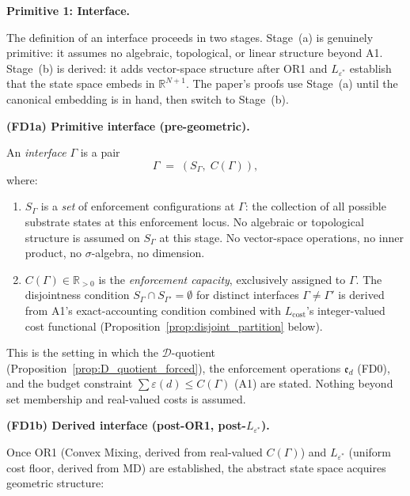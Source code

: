 \documentclass[11pt]{article}
\theoremstyle{remark}
\begin{document}
\begin{tcolorbox}[defbox, title={$\mathrm{FD1}$ (Interface): Two-Stage Definition}]
\noindent\textbf{Primitive 1: Interface.}

The definition of an interface proceeds in two stages.  Stage~(a) is genuinely primitive: it assumes no algebraic, topological, or linear structure beyond A1.  Stage~(b) is derived: it adds vector-space structure after OR1 and $L_{\varepsilon^*}$ establish that the state space embeds in $\mathbb{R}^{N+1}$.  The paper's proofs use Stage~(a) until the canonical embedding is in hand, then switch to Stage~(b).

\medskip
\noindent\textbf{(FD1a) Primitive interface (pre-geometric).}

An \emph{interface} $\Gamma$ is a pair
\[
\Gamma \;=\; (S_\Gamma,\; C(\Gamma)),
\]
where:
\begin{enumerate}[nosep,leftmargin=2em,itemsep=2pt,label=(\roman*)]
  \item $S_\Gamma$ is a \emph{set} of enforcement configurations at $\Gamma$: the collection of all possible substrate states at this enforcement locus.  No algebraic or topological structure is assumed on $S_\Gamma$ at this stage.  No vector-space operations, no inner product, no $\sigma$-algebra, no dimension.
  \item $C(\Gamma) \in \mathbb{R}_{>0}$ is the \emph{enforcement capacity}, exclusively assigned to $\Gamma$.  The disjointness condition $S_\Gamma \cap S_{\Gamma'} = \emptyset$ for distinct interfaces $\Gamma \ne \Gamma'$ is derived from A1's exact-accounting condition combined with $L_{\mathrm{cost}}$'s integer-valued cost functional (Proposition~\ref{prop:disjoint_partition} below).
\end{enumerate}
This is the setting in which the $\mathcal{D}$-quotient (Proposition~\ref{prop:D_quotient_forced}), the enforcement operations $\mathfrak{e}_d$ (FD0), and the budget constraint $\sum \varepsilon(d) \le C(\Gamma)$ (A1) are stated.  Nothing beyond set membership and real-valued costs is assumed.

\medskip
\noindent\textbf{(FD1b) Derived interface (post-OR1, post-$L_{\varepsilon^*}$).}

Once OR1 (Convex Mixing, derived from real-valued $C(\Gamma)$) and $L_{\varepsilon^*}$ (uniform cost floor, derived from MD) are established, the abstract state space acquires geometric structure:


\end{tcolorbox}
\end{document}
